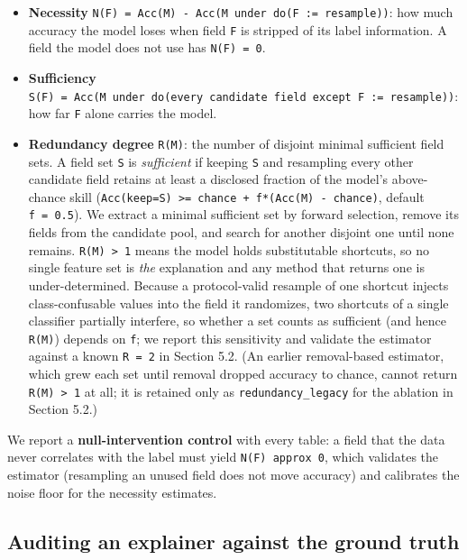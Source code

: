 \documentclass[journal]{IEEEtran}
\providecommand{\tightlist}{\setlength{\itemsep}{0pt}\setlength{\parskip}{0pt}}
\begin{document}
\begin{itemize}
\tightlist
\item
  \textbf{Necessity}
  \texttt{N(F)\ =\ Acc(M)\ -\ Acc(M\ under\ do(F\ :=\ resample))}: how
  much accuracy the model loses when field \texttt{F} is stripped of its
  label information. A field the model does not use has
  \texttt{N(F)\ =\ 0}.
\item
  \textbf{Sufficiency}
  \texttt{S(F)\ =\ Acc(M\ under\ do(every\ candidate\ field\ except\ F\ :=\ resample))}:
  how far \texttt{F} alone carries the model.
\item
  \textbf{Redundancy degree} \texttt{R(M)}: the number of disjoint
  minimal sufficient field sets. A field set \texttt{S} is
  \emph{sufficient} if keeping \texttt{S} and resampling every other
  candidate field retains at least a disclosed fraction of the model's
  above-chance skill
  (\texttt{Acc(keep=S)\ \textgreater{}=\ chance\ +\ f*(Acc(M)\ -\ chance)},
  default \texttt{f\ =\ 0.5}). We extract a minimal sufficient set by
  forward selection, remove its fields from the candidate pool, and
  search for another disjoint one until none remains.
  \texttt{R(M)\ \textgreater{}\ 1} means the model holds substitutable
  shortcuts, so no single feature set is \emph{the} explanation and any
  method that returns one is under-determined. Because a protocol-valid
  resample of one shortcut injects class-confusable values into the
  field it randomizes, two shortcuts of a single classifier partially
  interfere, so whether a set counts as sufficient (and hence
  \texttt{R(M)}) depends on \texttt{f}; we report this sensitivity and
  validate the estimator against a known \texttt{R\ =\ 2} in Section
  5.2. (An earlier removal-based estimator, which grew each set until
  removal dropped accuracy to chance, cannot return
  \texttt{R(M)\ \textgreater{}\ 1} at all; it is retained only as
  \texttt{redundancy\_legacy} for the ablation in Section 5.2.)
\end{itemize}

We report a \textbf{null-intervention control} with every table: a field
that the data never correlates with the label must yield
\texttt{N(F)\ approx\ 0}, which validates the estimator (resampling an
unused field does not move accuracy) and calibrates the noise floor for
the necessity estimates.

\subsection{Auditing an explainer against the ground truth}
\end{document}
